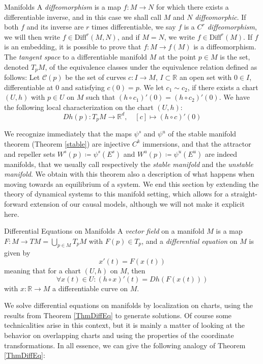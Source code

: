 \documentclass[11pt, a4paper]{memoir}
\theoremstyle{break}
\theoremstyle{break}
\theoremstyle{nonumberplain}
\newcommand{\mR}{\mathbb{R}}
\begin{document}
\begin{mydefinition}{Manifolds}
A \emph{diffeomorphism} is a map $f:M\to N$ for which there exists a differentiable inverse, and in this case we shall call $M$ and $N$ \emph{diffeomorphic}. If both $f$ and its inverse are $r$ times differentiable, we say $f$ is a \emph{$C^r$ diffeomorphism}, we will then write $f\in \text{Diff}^r(M,N)$, and if $M=N$, we write $f\in \text{Diff}^r(M)$. If $f$ is an embedding, it is possible to prove that $f:M\to f(M)$ is a diffeomorphism.\\[5pt]
The \emph{tangent space} to a differentiable manifold $M$ at the point $p\in M$ is the set, denoted $T_pM$, of the equivalence classes under the equivalence relation defined as follows: Let $\mathcal{C}(p)$ be the set of curves $c:I\to M$, $I\subset \mR$ an open set with $0\in I$, differentiable at $0$ and satisfying $c(0)=p$. We let $c_1\sim c_2$, if there exists a chart $(U,h)$ with $p\in U$ on $M$ such that $(h\circ c_1)'(0)=(h\circ c_2)'(0)$. We have the following local characterization on the chart $(U,h)$:
$$Dh(p):T_pM\to\mR^d,\quad [c]\mapsto (h\circ c)'(0)$$
\end{mydefinition}
\noindent We recognize immediately that the maps $\psi^s$ and $\psi^u$ of the stable manifold theorem (Theorem \ref{stable}) are injective $C^k$ immersions, and that the attractor and repeller sets $W^s(p)\coloneqq \psi^s(E^s)$ and $W^u(p)\coloneqq \psi^u(E^u)$ are indeed manifolds, that we usually call respectively the \emph{stable manifold} and the \emph{unstable manifold}. We obtain with this theorem also a description of what happens when moving towards an equilibrium of a system. We end this section by extending the theory of dynamical systems to this manifold setting, which allows for a straight-forward extension of our causal models, although we will not make it explicit here. 
\begin{mydefinition}{Differential Equations on Manifolds}
A \emph{vector field} on a manifold $M$ is a map $F:M\to TM=\bigcup_{p\in M}T_pM$ with $F(p)\in T_p$, and a \emph{differential equation} on $M$ is given by
\begin{equation}\label{diffeqmanif}
x'(t)=F(x(t))
\end{equation}
meaning that for a chart $(U,h)$ on $M$, then
$$\forall x(t)\in U: (h\circ x)'(t)=Dh(F(x(t)))$$
with $x:\mR\to M$ a differentiable curve on $M$.
\end{mydefinition}
We solve differential equations on manifolds by localization on charts, using the results from Theorem \ref{ThmDiffEq} to generate solutions. Of course some technicalities arise in this context, but it is mainly a matter of looking at the behavior on overlapping charts and using the properties of the coordinate transformations. In all essence, we can give the following analogy of Theorem \ref{ThmDiffEq}:
\end{document}

